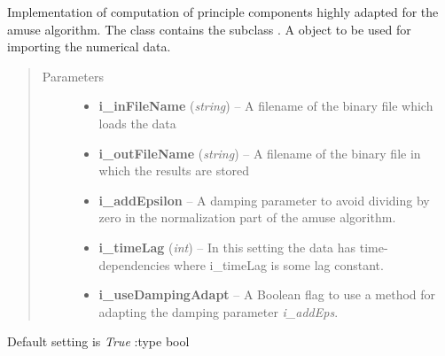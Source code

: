 \documentclass[letterpaper,10pt,english]{sphinxmanual}
\begin{document}
\begin{fulllineitems}
\label{tica:Tica_PrincipleComp.TicaPrinComp}
Implementation of computation of principle components highly adapted for the amuse algorithm.
The class {\hyperref[tica:Tica_PrincipleComp.TicaPrinComp]{}} contains the subclass {\hyperref[tica:Tica_PrincipleComp.TicaPrinComp.TicaPrinCompTimeLagged]{}}.
A {\hyperref[common:common_data_importer.CommonDataImporter]{}} object to be used for importing the numerical data.
\begin{quote}\begin{description}
\item[{Parameters}] \leavevmode\begin{itemize}
\item {} 
\textbf{i\_inFileName} (\emph{string}) -- A filename of the binary file which loads the data

\item {} 
\textbf{i\_outFileName} (\emph{string}) -- A filename of the binary file in which the results are stored

\item {} 
\textbf{i\_addEpsilon} -- A damping parameter to avoid dividing by zero in the normalization part of the amuse algorithm.

\item {} 
\textbf{i\_timeLag} (\emph{int}) -- In this setting the data has time-dependencies where i\_timeLag is some lag constant.

\item {} 
\textbf{i\_useDampingAdapt} -- A Boolean flag to use a method for adapting the damping parameter \emph{i\_addEps}.

\end{itemize}

\end{description}\end{quote}

Default setting is \emph{True}
:type bool


\end{fulllineitems}
\end{document}
